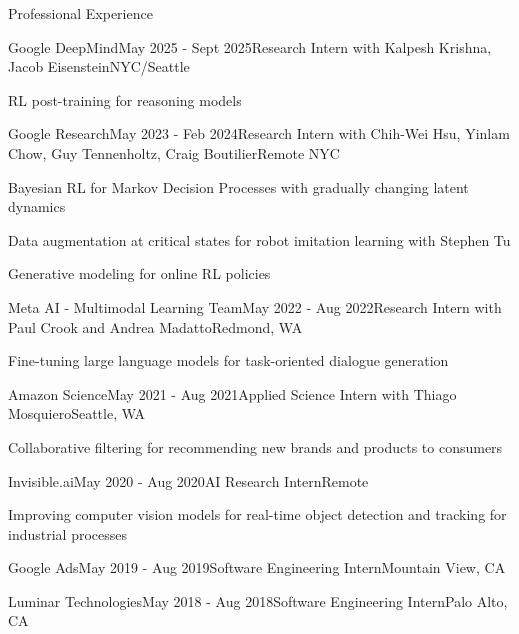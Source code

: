 \documentclass{resume}
\begin{document}
\begin{rSection}{Professional Experience}
\begin{rSubsection}{Google DeepMind}{May 2025 - Sept 2025}{Research Intern {\normalfont with Kalpesh Krishna, Jacob Eisenstein}}{NYC/Seattle}
\item RL post-training for reasoning models
\end{rSubsection}
\begin{rSubsection}{Google Research}{May 2023 - Feb 2024}{Research Intern {\normalfont with Chih-Wei Hsu, Yinlam Chow, Guy Tennenholtz, Craig Boutilier}}{Remote NYC}
\item Bayesian RL for Markov Decision Processes with gradually changing latent dynamics
\item Data augmentation at critical states for robot imitation learning with Stephen Tu
\item Generative modeling for online RL policies
\end{rSubsection}
\begin{rSubsection}{Meta AI - Multimodal Learning Team}{May 2022 - Aug 2022}{Research Intern {\normalfont with Paul Crook and Andrea Madatto}}{Redmond, WA}
\item Fine-tuning large language models for task-oriented dialogue generation
\end{rSubsection}
\begin{rSubsection}{Amazon Science}{May 2021 - Aug 2021}{Applied Science Intern {\normalfont with Thiago Mosquiero}}{Seattle, WA}
\item Collaborative filtering for recommending new brands and products to consumers
\end{rSubsection}
\begin{rSubsection}{Invisible.ai}{May 2020 - Aug 2020}{AI Research Intern}{Remote}
\item Improving computer vision models for real-time object detection and tracking for industrial processes
\end{rSubsection}
\begin{rSubsection}{Google Ads}{May 2019 - Aug 2019}{Software Engineering Intern}{Mountain View, CA}
\end{rSubsection}
\begin{rSubsection}{Luminar Technologies}{May 2018 - Aug 2018}{Software Engineering Intern}{Palo Alto, CA}
\end{rSubsection}
\end{rSection}
\end{document}

